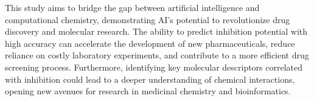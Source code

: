\documentclass[12pt,letterpaper]{article}
\begin{document}
\begin{multicols}{2}
This study aims to bridge the gap between artificial intelligence and computational chemistry, demonstrating AI’s potential to revolutionize drug discovery and molecular research. The ability to predict inhibition potential with high accuracy can accelerate the development of new pharmaceuticals, reduce reliance on costly laboratory experiments, and contribute to a more efficient drug screening process. Furthermore, identifying key molecular descriptors correlated with inhibition could lead to a deeper understanding of chemical interactions, opening new avenues for research in medicinal chemistry and bioinformatics.

\end{multicols}


% 
 
\end{document}
